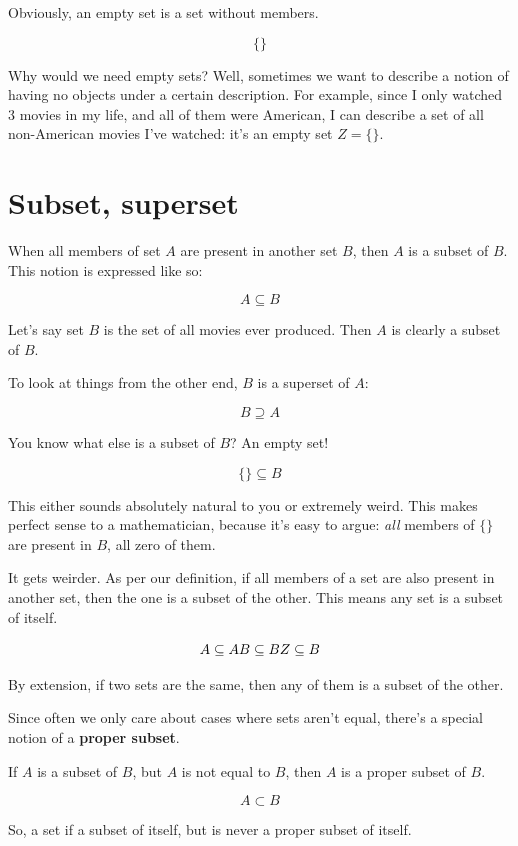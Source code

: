 \documentclass[a4paper, sfsidenotes, justified, notitlepage]{tufte-book-lite}
\begin{document}
Obviously, an empty set is a set without members.

\begin{equation}
\{\}
\end{equation}

Why would we need empty sets? Well, sometimes we want to describe a notion of having no objects under a certain description. For example, since I only watched 3 movies in my life, and all of them were American, I can describe a set of all non-American movies I've watched: it's an empty set \(Z = \{\}\).


\section{Subset, superset}
\label{sec:orgf825171}

When all members of set \(A\) are present in another set \(B\), then \(A\) is a subset of \(B\). This notion is expressed like so:

\begin{equation}
A \subseteq B
\end{equation}

Let's say set \(B\) is the set of all movies ever produced. Then \(A\) is clearly a subset of \(B\).

To look at things from the other end, \(B\) is a superset of \(A\):

\begin{equation}
B \supseteq A
\end{equation}

You know what else is a subset of \(B\)? An empty set!

\begin{equation}
\{\} \subseteq B
\end{equation}

This either sounds absolutely natural to you or extremely weird. This makes perfect sense to a mathematician, because it's easy to argue: \emph{all} members of \(\{\}\) are present in \(B\), all zero of them.

It gets weirder. As per our definition, if all members of a set are also present in another set, then the one is a subset of the other. This means any set is a subset of itself.

\begin{equation}
A \subseteq A \\
B \subseteq B \\
Z \subseteq B
\end{equation}

By extension, if two sets are the same, then any of them is a subset of the other.

Since often we only care about cases where sets aren't equal, there's a special notion of a \textbf{proper subset}.

If \(A\) is a subset of \(B\), but \(A\) is not equal to \(B\), then \(A\) is a proper subset of \(B\).

\begin{equation}
A \subset B
\end{equation}

So, a set if a subset of itself, but is never a proper subset of itself.
\end{document}

